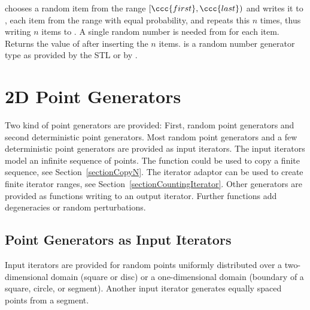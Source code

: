 
{ chooses a random item from the range $[\ccc{first},\ccc{last})$ and
    writes it to , each item from the range with equal
    probability, and repeats this $n$ times, thus writing $n$ items to
    .
    A single random number is needed from  for each item.
    Returns the value of  after inserting the $n$ items.
    \ccPrecond {} is a random number generator type as provided 
    by the STL or by .
}


\newpage
\section{2D Point Generators}
\label{sectionPointGenerators}

Two kind of point generators are provided: First, random point
generators and second deterministic point generators. Most random
point generators and a few deterministic point generators are provided
as input iterators.  The input iterators model an infinite sequence of
points. The function  could be used to copy a
finite sequence, see Section~\ref{sectionCopyN}. The iterator adaptor
 can be used to create finite iterator
ranges, see Section~\ref{sectionCountingIterator}.
Other generators are provided as functions writing to an output
iterator. Further functions add degeneracies or random perturbations.


\subsection{Point Generators as Input Iterators}

\ccDefinition

Input iterators are provided for random points uniformly distributed
over a two-dimensional domain (square or disc) or a one-dimensional
domain (boundary of a square, circle, or segment). Another input
iterator generates equally spaced points from a segment.

